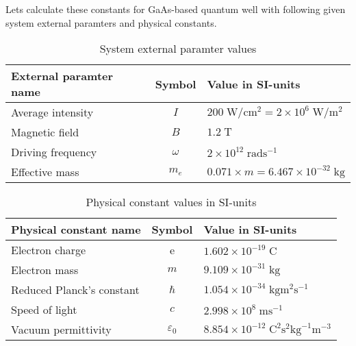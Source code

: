 \noindent
Lets calculate these constants for GaAs-based quantum well with following given system external paramters and physical constants.
\begin{table}[ht!]
\begin{center}
\begin{tabular}{ |l|c|l| }
 \hline
 \textbf{External paramter name} & \textbf{Symbol} & \textbf{Value in SI-units} \\ [0.5ex] \hline\hline
 Average intensity  & $I$ & $200\;\text{W}/\text{cm}^{2} = 2\times10^6\;\text{W}/\text{m}^{2}$ \\ \hline
 Magnetic field & $B$ & $1.2\;\text{T}$ \\ \hline
 Driving frequency & $\omega$ & $2\times10^{12} \;\text{rad}\text{s}^{-1}$ \\ \hline
 Effective mass &  $m_e$ & $0.071\times m = 6.467 \times10^{-32} \; \text{kg}$ \\ \hline
\end{tabular}
\caption {\label{tab:5.1}System external paramter values}
\end{center}
\end{table}

\begin{table}[ht!]
\begin{center}
\begin{tabular}{ |l|c|l| }
 \hline
 \textbf{Physical constant name} & \textbf{Symbol} & \textbf{Value in SI-units} \\ [0.5ex] \hline\hline
 Electron charge  & e & $1.602\times10^{-19} \;\text{C}$ \\ \hline
 Electron mass & $m$ & $9.109\times10^{-31}\; \text{kg}$ \\ \hline
 Reduced Planck's constant &  $\hbar$ & $1.054\times10^{-34} \;\text{kg}\text{m}^2\text{s}^{-1}$ \\ \hline
 Speed of light & $c$ & $2.998\times10^8\; \text{ms}^{-1}$ \\ \hline
 Vacuum permittivity & $\varepsilon_0$ & $8.854\times10^{-12}\; \text{C}^{2}\text{s}^2\text{kg}^{-1}\text{m}^{-3}$ \\ \hline
\end{tabular}
\caption {\label{tab:5.2}Physical constant values in SI-units}
\end{center}
\end{table}

